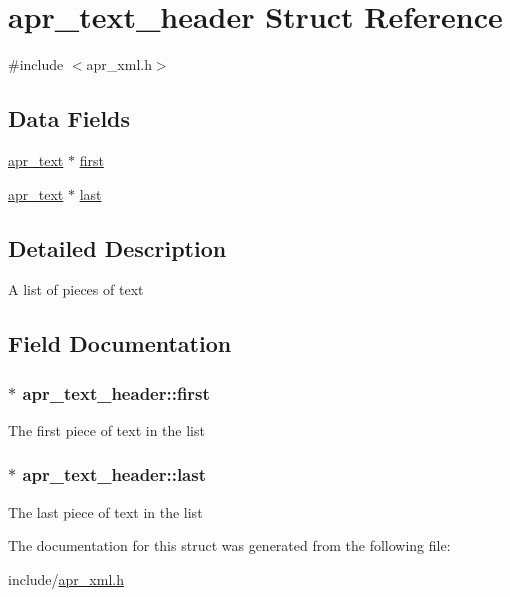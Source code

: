 \hypertarget{structapr__text__header}{\section{apr\-\_\-text\-\_\-header Struct Reference}
\label{structapr__text__header}
}


{\ttfamily \#include $<$apr\-\_\-xml.\-h$>$}

\subsection*{Data Fields}
\begin{DoxyCompactItemize}
\item 
\hyperlink{structapr__text}{apr\-\_\-text} $\ast$ \hyperlink{structapr__text__header_a6db03d272f5e56058c84e10e49624c0b}{first}
\item 
\hyperlink{structapr__text}{apr\-\_\-text} $\ast$ \hyperlink{structapr__text__header_a3ebe57b46d323b8cefaba1e114acf09e}{last}
\end{DoxyCompactItemize}


\subsection{Detailed Description}
A list of pieces of text 

\subsection{Field Documentation}
\hypertarget{structapr__text__header_a6db03d272f5e56058c84e10e49624c0b}{
\subsubsection[{first}]{$\ast$ apr\-\_\-text\-\_\-header\-::first}}\label{structapr__text__header_a6db03d272f5e56058c84e10e49624c0b}
The first piece of text in the list \hypertarget{structapr__text__header_a3ebe57b46d323b8cefaba1e114acf09e}{
\subsubsection[{last}]{$\ast$ apr\-\_\-text\-\_\-header\-::last}}\label{structapr__text__header_a3ebe57b46d323b8cefaba1e114acf09e}
The last piece of text in the list 

The documentation for this struct was generated from the following file\-:\begin{DoxyCompactItemize}
\item 
include/\hyperlink{apr__xml_8h}{apr\-\_\-xml.\-h}\end{DoxyCompactItemize}
